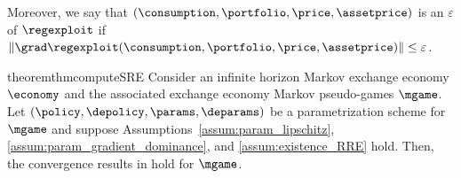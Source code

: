 {%

\noindent
Moreover, we say that $(\consumption, \portfolio, \price, \assetprice)$ is an $\varepsilon$ of $\regexploit$ if $\|\grad \regexploit(\consumption, \portfolio, \price, \assetprice)\|\leq \varepsilon$.
\fi 



\begin{restatable}{theorem}{thmcomputeSRE}
\label{thm:compute_SRE}
    Consider an infinite horizon Markov exchange economy $\economy$ and the associated exchange economy Markov pseudo-games $\mgame$. 
    Let $(\policy, \depolicy, \params, \deparams)$ be a parametrization scheme for $\mgame$ and
    suppose Assumptions~\ref{assum:param_lipschitz}, \ref{assum:param_gradient_dominance}, and \ref{assum:existence_RRE} hold.
    Then, the convergence results in  hold for $\mgame$.
\end{restatable}

}
